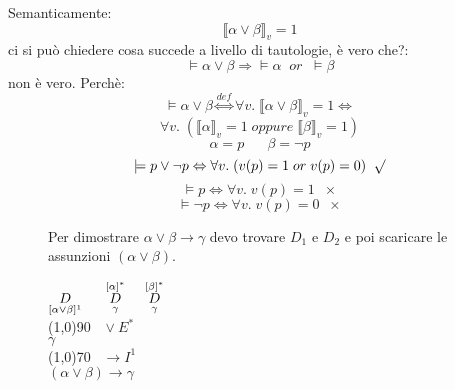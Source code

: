 \documentclass{article}
\theoremstyle{break}
\theoremstyle{break}
\theoremstyle{break}
\theoremstyle{break}
\begin{document}
Semanticamente:
\[
  \llbracket \alpha \vee \beta\rrbracket_v=1
\] 
ci si può chiedere cosa succede a livello di tautologie, è vero che?:
\[
  \models \alpha \vee \beta \Rightarrow \models \alpha\;\;or\;\; \models \beta
\] 
non è vero. Perchè:
\[
  \models \alpha \vee \beta \stackrel{def}{\Leftrightarrow} \forall v.\; \llbracket \alpha \vee \beta\rrbracket_v=1 \Leftrightarrow
\] 
\[
  \forall v.\; (\llbracket \alpha\rrbracket_v=1 \; oppure\; \llbracket \beta\rrbracket_v=1)
\] 
\[
  \alpha = p \;\;\;\;\;\; \beta = \neg p
\] 
\[
  \models p \vee \neg p \Leftrightarrow \forall v.\; (v(p) = 1 \; or\; v(p) = 0)\;\; \surd
\] 
\[
  \models p \Leftrightarrow \forall v. \; v(p) = 1\;\; \times
\] 
\[
  \models \neg p \Leftrightarrow \forall v. \; v(p) = 0\;\; \times
\] 
\begin{figure}[H]
  \begin{example}
    Per dimostrare \( \alpha \vee \beta \to \gamma \) devo trovare \( D_1 \) e \( D_2 \) e poi scaricare le
    assunzioni \( (\alpha \vee \beta) \).

    \begin{center}
      \( \underset{[\alpha \vee \beta]^1}{D} \hspace{0.5cm} \stackrel{[\alpha]^*}{\underset{\gamma}{D}} \hspace{0.5cm} \stackrel{[\beta]^*}{\underset{\gamma}{D}} \)\\
      \hspace{0.9cm}\line(1,0){90}\(\;\;\; \vee E^* \)\\  
      \( \gamma \)\\
      \hspace{0.9cm}\line(1,0){70}\(\;\;\; \to I^1 \)\\  
      \( (\alpha \vee \beta) \to \gamma \) 
    \end{center}
  \end{example}
\end{figure}
\end{document}
